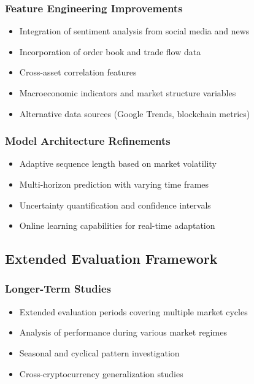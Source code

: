 \documentclass[11pt,a4paper]{article}
\begin{document}
\subsubsection{Feature Engineering Improvements}
\begin{itemize}
    \item Integration of sentiment analysis from social media and news
    \item Incorporation of order book and trade flow data
    \item Cross-asset correlation features
    \item Macroeconomic indicators and market structure variables
    \item Alternative data sources (Google Trends, blockchain metrics)
\end{itemize}

\subsubsection{Model Architecture Refinements}
\begin{itemize}
    \item Adaptive sequence length based on market volatility
    \item Multi-horizon prediction with varying time frames
    \item Uncertainty quantification and confidence intervals
    \item Online learning capabilities for real-time adaptation
\end{itemize}

\subsection{Extended Evaluation Framework}

\subsubsection{Longer-Term Studies}
\begin{itemize}
    \item Extended evaluation periods covering multiple market cycles
    \item Analysis of performance during various market regimes
    \item Seasonal and cyclical pattern investigation
    \item Cross-cryptocurrency generalization studies
\end{itemize}
\end{document}
